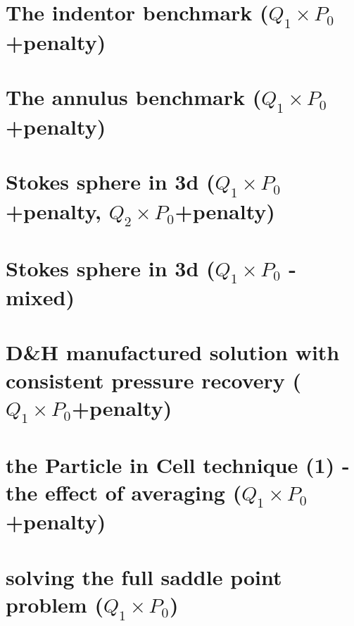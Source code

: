 \documentclass[a4paper,11pt]{report}
\begin{document}
\chapter{The indentor benchmark ($Q_1\times P_0$+penalty)\label{f08}} %
 
\chapter{The annulus benchmark ($Q_1\times P_0$+penalty) \label{f09}} %

\chapter{Stokes sphere in 3d ($Q_1 \times P_0$+penalty, $Q_2 \times P_0$+penalty)\label{f10}} %

\chapter{Stokes sphere in 3d ($Q_1\times P_0$ - mixed) \label{f11}} %

\chapter{D\&H manufactured solution with consistent pressure recovery ($Q_1\times P_0$+penalty)\label{f12}} %

\chapter{the Particle in Cell technique (1) - the effect of averaging ($Q_1\times P_0$+penalty)\label{f13}} %

\chapter{solving the full saddle point problem ($Q_1\times P_0$) \label{f14}} %
\end{document}
